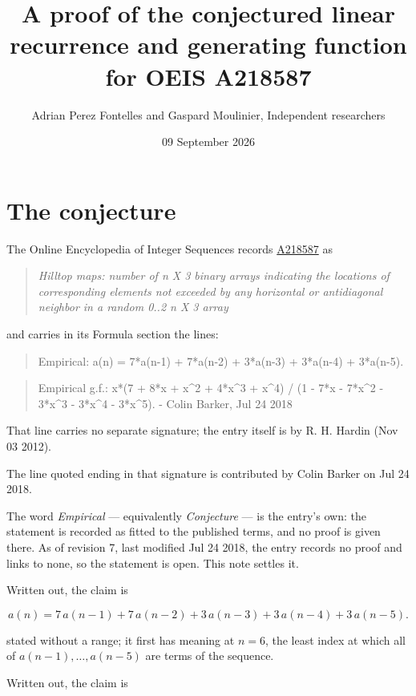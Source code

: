 \documentclass[11pt]{article}
\title{A proof of the conjectured linear recurrence and generating function for OEIS A218587}
\author{Adrian Perez Fontelles and Gaspard Moulinier, Independent researchers}
\date{09 September 2026}
\theoremstyle{definition}
\begin{document}
\maketitle
\section{The conjecture}

The Online Encyclopedia of Integer Sequences records \href{https://oeis.org/A218587}{A218587} as

\begin{quote}\itshape Hilltop maps: number of n X 3 binary arrays indicating the locations of corresponding elements not exceeded by any horizontal or antidiagonal neighbor in a random 0..2 n X 3 array\end{quote}

and carries in its Formula section the lines:

\begin{quote}\ttfamily Empirical: a(n) = 7*a(n-1) + 7*a(n-2) + 3*a(n-3) + 3*a(n-4) + 3*a(n-5).\end{quote}

\begin{quote}\ttfamily Empirical g.f.: x*(7 + 8*x + x\textasciicircum{}2 + 4*x\textasciicircum{}3 + x\textasciicircum{}4) / (1 - 7*x - 7*x\textasciicircum{}2 - 3*x\textasciicircum{}3 - 3*x\textasciicircum{}4 - 3*x\textasciicircum{}5). - Colin Barker, Jul 24 2018\end{quote}

That line carries no separate signature; the entry itself is by R. H. Hardin (Nov 03 2012).

The line quoted ending in that signature is contributed by Colin Barker on Jul 24 2018.

The word {\itshape Empirical} --- equivalently {\itshape Conjecture} --- is the entry's own: the statement is recorded as fitted to the published terms, and no proof is given there. As of revision 7, last modified Jul 24 2018, the entry records no proof and links to none, so the statement is open. This note settles it.

Written out, the claim is

\[a(n) = 7\,a(n-1) + 7\,a(n-2) + 3\,a(n-3) + 3\,a(n-4) + 3\,a(n-5).\]

stated without a range; it first has meaning at $n = 6$, the least index at which all of $a(n-1),\dots,a(n-5)$ are terms of the sequence.

Written out, the claim is
\end{document}
